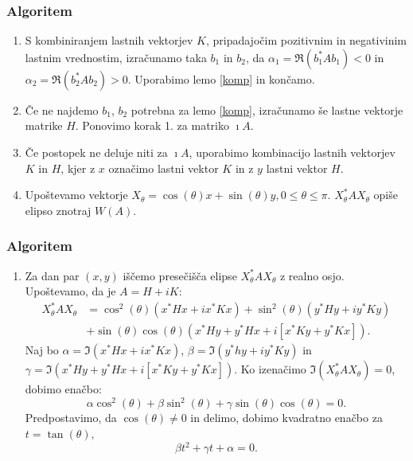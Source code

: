 \documentclass{beamer}
\newcounter{saveenumi}
\newcommand{\seti}{\setcounter{saveenumi}{\value{enumi}}}
\newcommand{\conti}{\setcounter{enumi}{\value{saveenumi}}}
\begin{document}
\begin{frame}
\frametitle{Algoritem}
\begin{enumerate}[1.]
\item S kombiniranjem lastnih vektorjev $K$, pripadajočim pozitivnim in negativinim lastnim vrednostim, izračunamo taka $b_1$ in $b_2$, da  $\alpha_1=\Re(b_1^\ast Ab_1)<0$ in $\alpha_2=\Re(b_2^\ast Ab_2)>0$. Uporabimo lemo \ref{komp} in končamo.\medskip
\item Če ne najdemo $b_1$, $b_2$ potrebna za lemo \ref{komp}, izračunamo še lastne vektorje matrike $H$.  Ponovimo korak 1. za matriko $\imath A$.\medskip
\item Če postopek ne deluje niti za $\imath A$, uporabimo kombinacijo lastnih vektorjev $K$ in $H$, kjer z $x$ označimo lastni vektor $K$ in z $y$ lastni vektor $H$.\medskip
\item Upoštevamo vektorje $X_\theta =\cos(\theta)x+\sin(\theta)y$$, 0\le\theta\le\pi$. $X_\theta ^\ast AX_\theta$ opiše elipso znotraj $W(A)$.
\seti
\end{enumerate}
\end{frame}
\begin{frame}
\frametitle{Algoritem}
\begin{enumerate}[1.]
\conti
\item Za dan par $(x,y)$ iščemo presečišča elipse $X_\theta ^\ast AX_\theta$ z realno osjo. U\-po\-šte\-va\-mo, da je $A=H+iK$: 
\begin{align*}
X_\theta^\ast AX_\theta &= \cos^2(\theta)(x^\ast Hx + ix^\ast Kx) + \sin^2(\theta)(y^\ast Hy + iy^\ast Ky)\\ 
&+\sin(\theta)\cos(\theta)(x^\ast Hy +y^\ast Hx +i[x^\ast Ky +y^\ast Kx]).
\end{align*}
Naj bo $\alpha=\Im(x^\ast Hx + ix^\ast Kx)$, $\beta=\Im(y^\ast hy +iy^\ast Ky)$ in\medskip $\gamma=\Im(x^\ast Hy +y^\ast Hx +i[x^\ast Ky +y^\ast Kx]).$ Ko izenačimo $\Im(X_\theta ^\ast AX_\theta)=0$, dobimo enačbo:
$$\alpha \cos^2(\theta) +\beta \sin^2(\theta) +\gamma \sin(\theta)\cos(\theta)=0.$$
Predpostavimo, da $\cos(\theta) \not =0$ in delimo, dobimo kvadratno enačbo za $t=\tan(\theta),$
$$\beta t^2 +\gamma t +\alpha =0.$$
\seti
\end{enumerate}
\end{frame}
\end{document}
